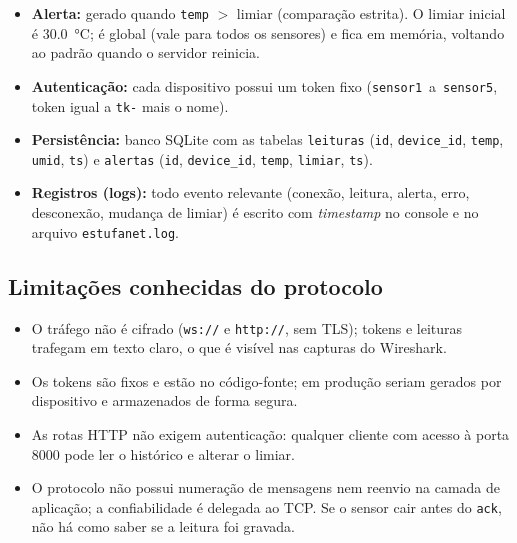 \documentclass[12pt,a4paper]{article}
\begin{document}
\begin{itemize}
  \item \textbf{Alerta:} gerado quando \texttt{temp} $>$ limiar (compara\c{c}\~ao estrita). O limiar
        inicial \'e \SI{30.0}{\celsius}; \'e global (vale para todos os sensores) e fica em mem\'oria,
        voltando ao padr\~ao quando o servidor reinicia.
  \item \textbf{Autentica\c{c}\~ao:} cada dispositivo possui um token fixo
        (\texttt{sensor1}~a~\texttt{sensor5}, token igual a \texttt{tk-} mais o nome).
  \item \textbf{Persist\^encia:} banco SQLite com as tabelas \texttt{leituras}
        (\texttt{id}, \texttt{device\_id}, \texttt{temp}, \texttt{umid}, \texttt{ts}) e \texttt{alertas}
        (\texttt{id}, \texttt{device\_id}, \texttt{temp}, \texttt{limiar}, \texttt{ts}).
  \item \textbf{Registros (logs):} todo evento relevante (conex\~ao, leitura, alerta,
        erro, desconex\~ao, mudan\c{c}a de limiar) \'e escrito com \emph{timestamp}
        no console e no arquivo \texttt{estufanet.log}.
\end{itemize}

\subsection{Limita\c{c}\~oes conhecidas do protocolo}

\begin{itemize}
  \item O tr\'afego n\~ao \'e cifrado (\texttt{ws://} e \texttt{http://}, sem TLS); tokens e
        leituras trafegam em texto claro, o que \'e vis\'ivel nas capturas do Wireshark.
  \item Os tokens s\~ao fixos e est\~ao no c\'odigo-fonte; em produ\c{c}\~ao seriam
        gerados por dispositivo e armazenados de forma segura.
  \item As rotas HTTP n\~ao exigem autentica\c{c}\~ao: qualquer cliente com acesso \`a porta
        8000 pode ler o hist\'orico e alterar o limiar.
  \item O protocolo n\~ao possui numera\c{c}\~ao de mensagens nem reenvio na camada de
        aplica\c{c}\~ao; a confiabilidade \'e delegada ao TCP. Se o sensor cair antes do
        \texttt{ack}, n\~ao h\'a como saber se a leitura foi gravada.
\end{itemize}
\end{document}
